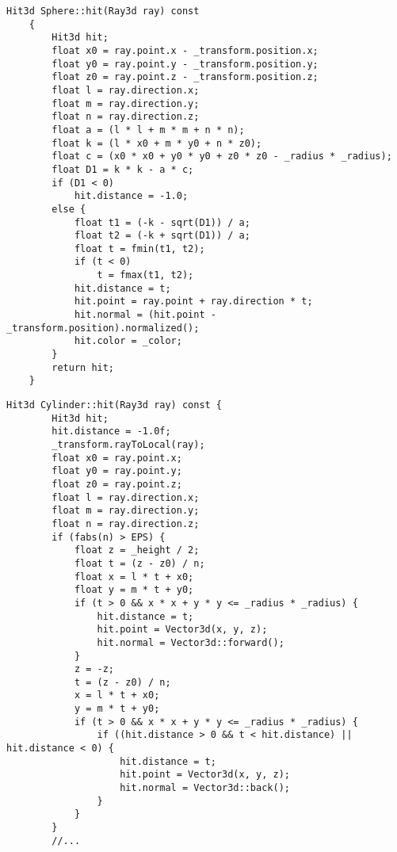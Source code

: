 \begin{center}
	\captionsetup{justification=raggedright,singlelinecheck=off}
	\begin{lstlisting}[label=lst:sphere_hit, caption=Алгоритм нахождения пересечения луча со сферой]
	Hit3d Sphere::hit(Ray3d ray) const
	{
		Hit3d hit;
		float x0 = ray.point.x - _transform.position.x;
		float y0 = ray.point.y - _transform.position.y;
		float z0 = ray.point.z - _transform.position.z;
		float l = ray.direction.x;
		float m = ray.direction.y;
		float n = ray.direction.z;
		float a = (l * l + m * m + n * n);
		float k = (l * x0 + m * y0 + n * z0);
		float c = (x0 * x0 + y0 * y0 + z0 * z0 - _radius * _radius);
		float D1 = k * k - a * c;
		if (D1 < 0)
			hit.distance = -1.0;
		else {
			float t1 = (-k - sqrt(D1)) / a;
			float t2 = (-k + sqrt(D1)) / a;
			float t = fmin(t1, t2);
			if (t < 0)
				t = fmax(t1, t2);
			hit.distance = t;
			hit.point = ray.point + ray.direction * t;
			hit.normal = (hit.point - _transform.position).normalized();
			hit.color = _color;
		}
		return hit;
	}
	\end{lstlisting}
\end{center}

\clearpage

\begin{center}
	\captionsetup{justification=raggedright,singlelinecheck=off}
	\begin{lstlisting}[label=lst:cylinder_hit_begin, caption=Алгоритм нахождения пересечения луча с цилиндром (начало)]
	Hit3d Cylinder::hit(Ray3d ray) const {
		Hit3d hit;
		hit.distance = -1.0f;
		_transform.rayToLocal(ray);
		float x0 = ray.point.x;
		float y0 = ray.point.y;
		float z0 = ray.point.z;
		float l = ray.direction.x;
		float m = ray.direction.y;
		float n = ray.direction.z;
		if (fabs(n) > EPS) {
			float z = _height / 2;
			float t = (z - z0) / n;
			float x = l * t + x0;
			float y = m * t + y0;
			if (t > 0 && x * x + y * y <= _radius * _radius) {
				hit.distance = t;
				hit.point = Vector3d(x, y, z);
				hit.normal = Vector3d::forward();
			}
			z = -z;
			t = (z - z0) / n;
			x = l * t + x0;
			y = m * t + y0;
			if (t > 0 && x * x + y * y <= _radius * _radius) {
				if ((hit.distance > 0 && t < hit.distance) || hit.distance < 0) {
					hit.distance = t;
					hit.point = Vector3d(x, y, z);
					hit.normal = Vector3d::back();
				}
			}
		}
		//...
	\end{lstlisting}
\end{center}

\clearpage

